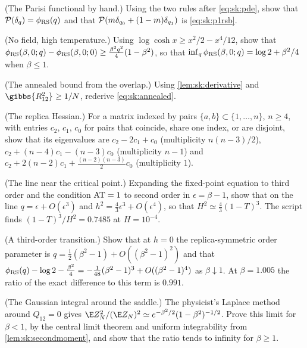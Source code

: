 \begin{refsection}
\begin{exercises}
\item \consolidation (The Parisi functional by hand.) Using the two rules after \eqref{eq:sk:pde}, show that $\mathcal{P}(\delta_q)=\phi_{\mathrm{RS}}(q)$ and that $\mathcal{P}(m\delta_{q_0}+(1-m)\delta_{q_1})$ is \eqref{eq:sk:p1rsb}.\label{ex:sk:pde}

\item \consolidation (No field, high temperature.) Using $\log\cosh x\ge x^2/2-x^4/12$, show that $\phi_{\mathrm{RS}}(\beta,0;q)-\phi_{\mathrm{RS}}(\beta,0;0)\ge\frac{\beta^2q^2}4(1-\beta^2)$, so that $\inf_q\phi_{\mathrm{RS}}(\beta,0;q)=\log2+\beta^2/4$ when $\beta\le1$.\label{ex:sk:qzero}

\item \consolidation (The annealed bound from the overlap.) Using \cref{lem:sk:derivative} and $\gibbs{R_{12}^2}\ge1/N$, rederive \eqref{eq:sk:annealed}.\label{ex:sk:derivative}

\item \byhand (The replica Hessian.) For a matrix indexed by pairs $\{a,b\}\subset\{1,\dots,n\}$, $n\ge4$, with entries $c_2$, $c_1$, $c_0$ for pairs that coincide, share one index, or are disjoint, show that its eigenvalues are $c_2-2c_1+c_0$ (multiplicity $n(n-3)/2$), $c_2+(n-4)c_1-(n-3)c_0$ (multiplicity $n-1$) and $c_2+2(n-2)c_1+\frac{(n-2)(n-3)}2c_0$ (multiplicity $1$).\label{ex:sk:replicon}

\item \byhand\hard (The line near the critical point.) Expanding the fixed-point equation to third order and the condition $\mathrm{AT}=1$ to second order in $\epsilon=\beta-1$, show that on the line $q=\epsilon+O(\epsilon^3)$ and $h^2=\frac43\epsilon^3+O(\epsilon^4)$, so that $H^2\simeq\frac43(1-T)^3$.  The script finds $(1-T)^3/H^2=0.7485$ at $H=10^{-4}$.\label{ex:sk:smallfield}

\item \byhand (A third-order transition.) Show that at $h=0$ the replica-symmetric order parameter is $q=\frac12(\beta^2-1)+O((\beta^2-1)^2)$ and that $\phi_{\mathrm{RS}}(q)-\log2-\frac{\beta^2}4=-\frac1{48}(\beta^2-1)^3+O((\beta^2-1)^4)$ as $\beta\downarrow1$.  At $\beta=1.005$ the ratio of the exact difference to this term is $0.991$.\label{ex:sk:critical}

\item \translate (The Gaussian integral around the saddle.) The physicist's Laplace method around $Q_{12}=0$ gives $\E Z_N^2/(\E Z_N)^2\simeq e^{-\beta^2/2}(1-\beta^2)^{-1/2}$. Prove this limit for $\beta<1$, by the central limit theorem and uniform integrability from \cref{lem:sk:secondmoment}, and show that the ratio tends to infinity for $\beta\ge1$.\label{ex:sk:hs}


\end{exercises}
\end{refsection}
